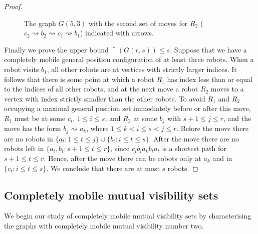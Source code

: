 \documentclass[a4paper,12pt]{article}
\DeclareMathOperator{\mob}{Mob_{gp}}
\theoremstyle{definition}
\newcommand{\move}{\rightsquigarrow}
\begin{document}
\begin{proof}
\begin{figure}[h!]
			\caption{The graph $G(5,3)$ with the second set of moves for $R_2$ ($c_2 \move b_2 \move c_1 \move b_1$) indicated with arrows.}
			\label{fig:G(5,3)perm2}
		\end{figure}   
		
		
		Finally we prove the upper bound $\mob ^*(G(r,s)) \leq s$. Suppose that we have a completely mobile general position configuration of at least three robots. When a robot visits $b_1$, all other robots are at vertices with strictly larger indices. It follows that there is some point at which a robot $R_1$ has index less than or equal to the indices of all other robots, and at the next move a robot $R_2$ moves to a vertex with index strictly smaller than the other robots. To avoid $R_1$ and $R_2$ occupying a maximal general position set immediately before or after this move, $R_1$ must be at some $c_i$, $1 \leq i \leq s$, and $R_2$ at some $b_j$ with $s+1 \leq j \leq r$, and the move has the form $b_j \move a_k$, where $1 \leq k < i \leq s < j \leq r$. Before the move there are no robots in $\{ a_t: 1 \leq t \leq j\} \cup \{ b_t: i \leq t \leq s\} $. After the move there are no robots left in $\{ a_t,b_t: s+1\leq t \leq r\} $, since $c_ib_ia_kb_ta_t$ is a shortest path for $s+1 \leq t \leq r$. Hence, after the move there can be robots only at $a_k$ and in $\{ c_t : i \leq t \leq s\} $. We conclude that there are at most $s$ robots.
	\end{proof}
	
	\subsection{Completely mobile mutual visibility sets}\label{subsec:completely mobile mv}
	
	We begin our study of completely mobile mutual visibility sets by characterising the graphs with completely mobile mutual visibility number two.
	
\end{document}
